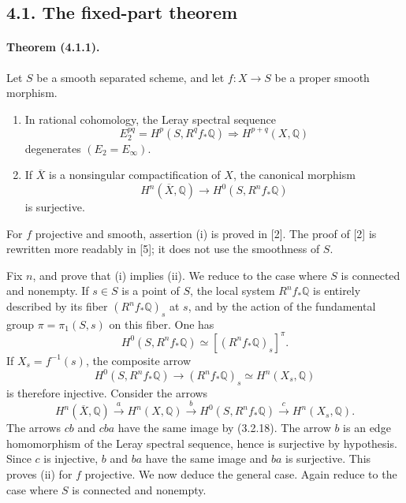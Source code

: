 \documentclass[10pt]{article}
\newcommand{\Q}{\mathbb Q}
\begin{document}
\subsection*{4.1. The fixed-part theorem}

\paragraph{Theorem (4.1.1).} Let $S$ be a smooth separated scheme, and let $f:X\to S$ be a proper smooth morphism.
\begin{enumerate}[label=(\roman*)]
\item In rational cohomology, the Leray spectral sequence
\[
E_2^{pq}=H^p(S,R^qf_*\Q)\Longrightarrow H^{p+q}(X,\Q)
\]
degenerates $(E_2=E_\infty)$.
\item If $\overline X$ is a nonsingular compactification of $X$, the canonical morphism
\[
H^n(\overline X,\Q)\longrightarrow H^0(S,R^nf_*\Q)
\]
is surjective.
\end{enumerate}

For $f$ projective and smooth, assertion (i) is proved in [2]. The proof of [2] is rewritten more readably in [5]; it does not use the smoothness of $S$.

Fix $n$, and prove that (i) implies (ii). We reduce to the case where $S$ is connected and nonempty. If $s\in S$ is a point of $S$, the local system $R^nf_*\Q$ is entirely described by its fiber $(R^nf_*\Q)_s$ at $s$, and by the action of the fundamental group $\pi=\pi_1(S,s)$ on this fiber. One has
\[
H^0(S,R^nf_*\Q)\simeq[(R^nf_*\Q)_s]^\pi.
\]
If $X_s=f^{-1}(s)$, the composite arrow
\[
H^0(S,R^nf_*\Q)\longrightarrow (R^nf_*\Q)_s\simeq H^n(X_s,\Q)
\]
is therefore injective. Consider the arrows
\[
H^n(\overline X,\Q)\xrightarrow{a}H^n(X,\Q)\xrightarrow{b}
H^0(S,R^nf_*\Q)\xrightarrow{c}H^n(X_s,\Q).
\]
The arrows $cb$ and $cba$ have the same image by (3.2.18). The arrow $b$ is an edge homomorphism of the Leray spectral sequence, hence is surjective by hypothesis. Since $c$ is injective, $b$ and $ba$ have the same image and $ba$ is surjective. This proves (ii) for $f$ projective. We now deduce the general case. Again reduce to the case where $S$ is connected and nonempty.
\end{document}
